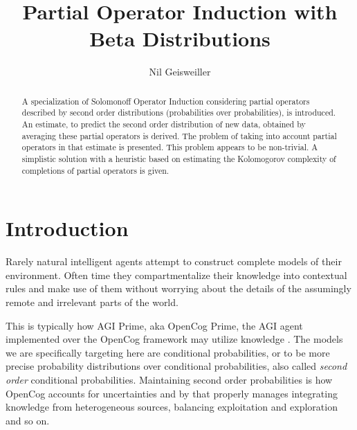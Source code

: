 \documentclass[runningheads]{llncs}
\begin{document}
%
\title{Partial Operator Induction with Beta Distributions}
%
%
\author{Nil Geisweiller}
%
%
%
\maketitle              %
%
\begin{abstract}
  A specialization of Solomonoff Operator Induction considering
  partial operators described by second order distributions
  (probabilities over probabilities), is introduced. An estimate, to
  predict the second order distribution of new data, obtained by
  averaging these partial operators is derived. The problem of taking
  into account partial operators in that estimate is presented. This
  problem appears to be non-trivial. A simplistic solution with a
  heuristic based on estimating the Kolomogorov complexity of
  completions of partial operators is given.

\end{abstract}
%
%
%
\section{Introduction}
Rarely natural intelligent agents attempt to construct complete models
of their environment. Often time they compartmentalize their knowledge
into contextual rules and make use of them without worrying about the
details of the assumingly remote and irrelevant parts of the world.

This is typically how AGI Prime, aka OpenCog Prime, the AGI agent
implemented over the OpenCog framework may utilize knowledge
\cite{Goertzel15Speculative}. The models we are specifically targeting
here are conditional probabilities, or to be more precise probability
distributions over conditional probabilities, also called \emph{second
  order} conditional probabilities. Maintaining second order
probabilities is how OpenCog accounts for uncertainties
\cite{Ikle08Probabilistic} and by that properly manages integrating
knowledge from heterogeneous sources, balancing exploitation and
exploration and so on.
\end{document}
